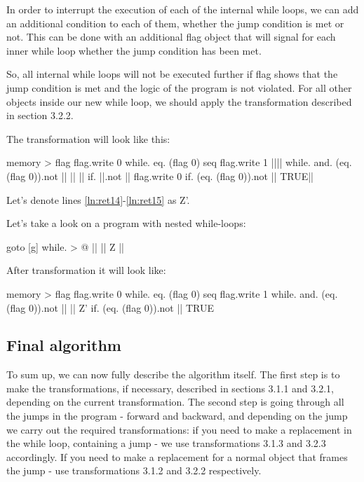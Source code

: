 \documentclass[sigplan,review,11pt,nonacm,natbib=false]{acmart}
\begin{document}
In order to interrupt the execution of each of the internal while loops, we can add an additional condition to each of them, whether the jump condition is met or not. This can be done with an additional flag object that will signal for each inner while loop whether the jump condition has been met.

So, all internal while loops will not be executed further if flag shows that the jump condition is met and the logic of the program is not violated. For all other objects inside our new while loop, we should apply the transformation described in section 3.2.2.

The transformation will look like this:

\begin{ffcode}

memory > flag
flag.write 0
while.
  eq. (flag 0)
  seq
    flag.write 1
    |||$\label{ln:ret14}$|
      while.
        and.
          (eq. (flag 0)).not
          ||
        ||
          ||
          if.
            ||.not
            ||
            flag.write 0
          if.
            (eq. (flag 0)).not
            ||
            TRUE|$\label{ln:ret15}$|
        
\end{ffcode}

Let's denote lines \ref{ln:ret14}-\ref{ln:ret15} as Z'.


Let's take a look on a program with nested while-loops:
\begin{ffcode}

goto
  [g]
    while. > @
      ||
      ||
        Z
        ||

\end{ffcode}

After transformation it will look like:
\begin{ffcode}

memory > flag
flag.write 0
while.
  eq. (flag 0)
  seq
    flag.write 1
    while.
      and.
        (eq. (flag 0)).not
        ||
      ||
        Z'
        if.
          (eq. (flag 0)).not
          ||
          TRUE

\end{ffcode}



\subsection{Final algorithm}
To sum up, we can now fully describe the algorithm itself. The first step is to make the transformations, if necessary, described in sections 3.1.1 and 3.2.1, depending on the current transformation. The second step is going through all the jumps in the program - forward and backward, and depending on the jump we carry out the required transformations: if you need to make a replacement in the while loop, containing a jump - we use transformations 3.1.3 and 3.2.3 accordingly. If you need to make a replacement for a normal object that frames the jump - use transformations 3.1.2 and 3.2.2 respectively.
\end{document}
